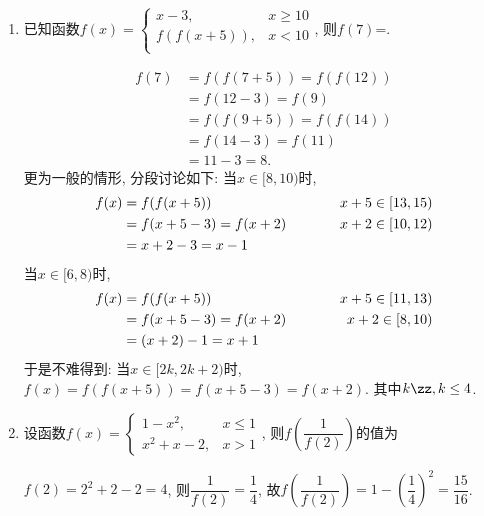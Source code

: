 \begin{enumerate}
    \item 已知函数$f(x)=\begin{cases}
    x-3, & x\geq 10\\
    f(f(x+5)), & x<10\\    
    \end{cases}$, 
    则$f(7)$=.
    \begin{jieda}
    \begin{align*}
    f(7) & =f(f(7+5))=f(f(12))\\
    & =f(12-3)=f(9)\\
    & =f(f(9+5))=f(f(14))\\
    & =f(14-3)=f(11)\\
    & =11-3=8.
    \end{align*}
    更为一般的情形, 分段讨论如下: 当$x\in[8,10)$时, 
    \begin{align*}
    f(x) & = f(f(x+5)) & \hspace*{1cm} x+5\in[13,15)\\
    & = f(x+5-3)=f(x+2) & \hspace*{1cm} x+2\in[10,12)\\
    & = x+2-3=x-1 & 
    \end{align*}
    当$x\in[6,8)$时, 
    \begin{align*}
    f(x) & = f(f(x+5)) & \hspace*{1cm} x+5\in[11,13)\\
    & = f(x+5-3)=f(x+2) & \hspace*{1cm} x+2\in[8,10)\\
    & = (x+2)-1=x+1
    \end{align*}
    于是不难得到: 当$x\in[2k,2k+2)$时, $f(x)=f(f(x+5))=f(x+5-3)=f(x+2)$. 其中$k\zz,k\leq 4$. 
    \end{jieda}
    \item 设函数$f(x)=\begin{cases}
    1-x^2, & x\leq 1\\
    x^2+x-2, & x>1
    \end{cases}$, 
    则$f\left(\dfrac{1}{f(2)}\right)$的值为
    \begin{jieda}
    $f(2)=2^2+2-2=4$, 则$\dfrac{1}{f(2)}=\dfrac{1}{4}$, 故$f\left(\dfrac{1}{f(2)}\right)=1-\left(\dfrac{1}{4}\right)^2=\dfrac{15}{16}$. 
    \end{jieda}
    

\end{enumerate}
